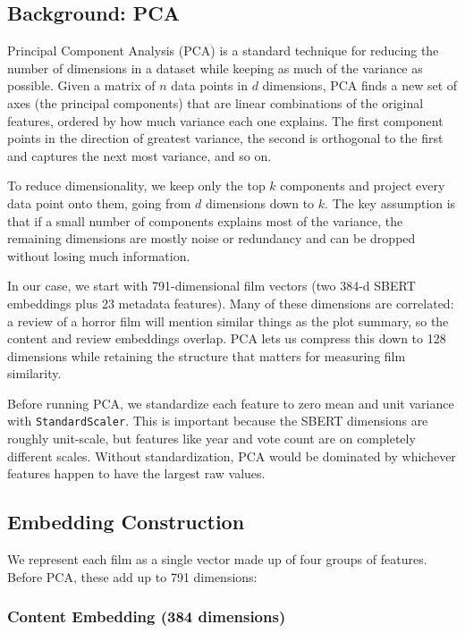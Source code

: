 \documentclass[sigconf,nonacm]{acmart}
\begin{document}
\subsection{Background: PCA}

Principal Component Analysis (PCA) is a standard technique for reducing the number of dimensions in a dataset while keeping as much of the variance as possible. Given a matrix of $n$ data points in $d$ dimensions, PCA finds a new set of axes (the principal components) that are linear combinations of the original features, ordered by how much variance each one explains. The first component points in the direction of greatest variance, the second is orthogonal to the first and captures the next most variance, and so on.

To reduce dimensionality, we keep only the top $k$ components and project every data point onto them, going from $d$ dimensions down to $k$. The key assumption is that if a small number of components explains most of the variance, the remaining dimensions are mostly noise or redundancy and can be dropped without losing much information.

In our case, we start with 791-dimensional film vectors (two 384-d SBERT embeddings plus 23 metadata features). Many of these dimensions are correlated: a review of a horror film will mention similar things as the plot summary, so the content and review embeddings overlap. PCA lets us compress this down to 128 dimensions while retaining the structure that matters for measuring film similarity.

Before running PCA, we standardize each feature to zero mean and unit variance with \texttt{StandardScaler}. This is important because the SBERT dimensions are roughly unit-scale, but features like year and vote count are on completely different scales. Without standardization, PCA would be dominated by whichever features happen to have the largest raw values.

\subsection{Embedding Construction}

We represent each film as a single vector made up of four groups of features. Before PCA, these add up to 791 dimensions:

\subsubsection{Content Embedding (384 dimensions)}
\end{document}
